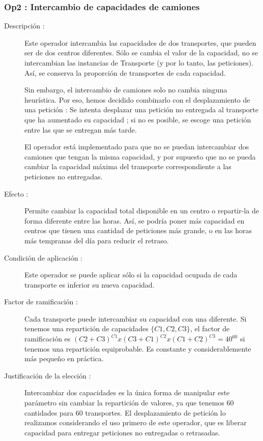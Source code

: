 \documentclass{article}
\begin{document}
\subsubsection{Op2 : Intercambio de capacidades de camiones}

\begin{description}
\item[Descripción :] Este operador intercambia las capacidades de dos
transportes, que pueden ser de dos centros diferentes. Sólo se cambia el valor
de la capacidad, no se intercambian las instancias de Transporte (y por lo
tanto, las peticiones). Así, se conserva la proporción de transportes de cada
capacidad. 

Sin embargo, el intercambio de camiones solo no cambia ninguna heurística. Por
eso, hemos decidido combinarlo con el desplazamiento de una petición : Se
intenta desplazar una petición no entregada al transporte que ha aumentado su
capacidad ; si no es posible, se escoge una petición entre las que se entregan
más tarde.

El operador está implementado para que no se puedan intercambiar dos camiones
que tengan la misma capacidad, y por supuesto que no se pueda cambiar la
capacidad máxima del transporte correspondiente a las peticiones no entregadas.
\item[Efecto :] Permite cambiar la capacidad total disponible en un centro o
repartir-la de forma diferente entre las horas. Así, se podría poner más
capacidad en centros que tienen una cantidad de peticiones más grande, o en las
horas más tempranas del día para reducir el retraso.
\item[Condición de aplicación :] Este operador se puede aplicar sólo si la
capacidad ocupada de cada transporte es inferior su nueva capacidad. 
\item[Factor de ramificación :] Cada transporte puede intercambiar su capacidad
con una diferente. Si tenemos una repartición de capacidades $\{C1,C2,C3\}$, el
factor de ramificación es $(C2+C3)^{C1}x(C3+C1)^{C2}x(C1+C2)^{C3} = 40^{60}$ si
tenemos una repartición equiprobable. Es constante y considerablemente más
pequeño en práctica.
\item[Justificación de la elección :] Intercambiar dos capacidades es la única
forma de manipular este parámetro sin cambiar la repartición de valores, ya que
tenemos 60 cantidades para 60 transportes. El desplazamiento de petición lo
realizamos considerando el uso primero de este operador, que es liberar
capacidad para entregar peticiones no entregadas o retrasadas.
\end{description}
\end{document}
